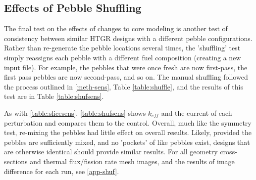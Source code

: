 \subsection{Effects of Pebble Shuffling}
\label{res-shuff}

The final test on the effects of changes to core modeling is another test of consistency between similar HTGR designs with a different pebble configurations.  Rather than re-generate the pebble locations several times, the 'shuffling' test simply reassigns each pebble with a different fuel composition (creating a new input file).  For example, the pebbles that were once fresh are now first-pass, the first pass pebbles are now second-pass, and so on.  The manual shuffling followed the process outlined in \autoref{meth-sens}, Table \ref{table:shuffle}, and the results of this test are in Table \ref{table:shufsens}.



As with \ref{table:slicesens}, \ref{table:shufsens} shows $k_{eff}$ and the current of each perturbation and compares them to the control.  Overall, much like the symmetry test, re-mixing the pebbles had little effect on overall results.  Likely, provided the pebbles are sufficiently mixed, and no 'pockets' of like pebbles exist, designs that are otherwise identical should provide similar results.  For all geometry cross-sections and thermal flux/fission rate mesh images, and the results of image difference for each run, see \autoref{app-shuf}.
